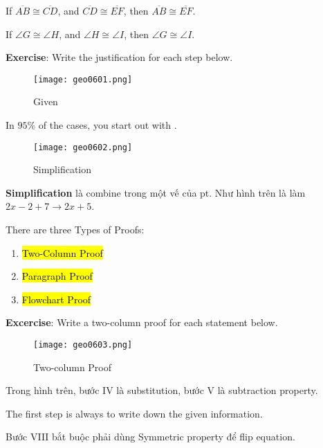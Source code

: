 If $\overline{AB} \cong \overline{CD}$, and $\overline{CD} \cong \overline{EF}$, then $\overline{AB} \cong \overline{EF}$.

If $\angle G \cong \angle H$, and $\angle H \cong \angle I$, then $\angle G \cong \angle I$.

\vspace{.5cm}

\textbf{Exercise}: Write the justification for each step below.

\begin{figure}[htb!]
  \centering
  \texttt{[image: geo0601.png]}
  \caption{Given}
\end{figure}

In $95\%$ of the cases, you start out with .

\begin{figure}[htb!]
  \centering
  \texttt{[image: geo0602.png]}
  \caption{Simplification}
\end{figure}

\textbf{Simplification} là combine trong một vế của pt. Như hình trên là làm $2x-2+7 \rightarrow 2x+5$.

\vspace{.5cm}

There are three Types of Proofs:

\begin{enumerate}
  \item \hl{Two-Column Proof}
  \item \hl{Paragraph Proof}
  \item \hl{Flowchart Proof}
\end{enumerate}

\newpage

\textbf{Excercise}: Write a two-column proof for each statement below.

\begin{figure}[htb!]
  \centering
  \texttt{[image: geo0603.png]}
  \caption{Two-column Proof}
\end{figure}

Trong hình trên, bước IV là substitution, bước V là subtraction property.

The first step is always to write down the given information.

Bước VIII bắt buộc phải dùng Symmetric property để flip equation.

\vspace{.5cm}

